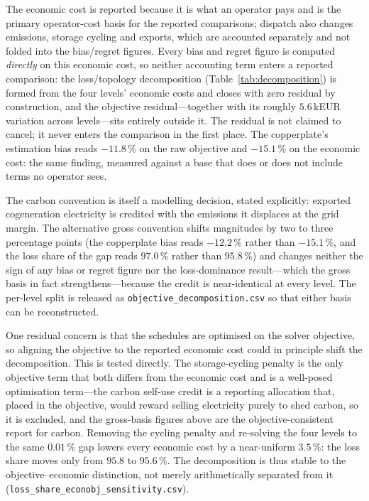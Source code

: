 The economic cost is reported because it is what an operator pays and is the primary
operator-cost basis for the reported comparisons; dispatch also changes emissions, storage
cycling and exports, which are accounted separately and not folded into the bias/regret
figures. Every bias and regret figure is computed \emph{directly} on this
economic cost, so neither accounting term enters a reported comparison: the loss/topology
decomposition (Table~\ref{tab:decomposition}) is formed from the four levels' economic costs and
closes with zero residual by construction, and the objective residual---together with its
roughly $5.6$\,kEUR variation across levels---sits entirely outside it. The residual is not
claimed to cancel; it never enters the comparison in the first place. The copperplate's
estimation bias reads $-11.8$\,\% on the raw objective and $\mathbf{-15.1}$\,\% on the
economic cost: the same finding, measured against a base that does or does not include
terms no operator sees.

The carbon convention is itself a modelling decision, stated explicitly: exported
cogeneration electricity is credited with the emissions it displaces at the grid margin.
The alternative gross convention shifts magnitudes by two to three percentage points
(the copperplate bias reads $-12.2$\,\% rather than $-15.1$\,\%, and the loss share of the gap
reads $97.0$\,\% rather than $95.8$\,\%) and changes
neither the sign of any bias or regret figure nor the loss-dominance result---which the gross
basis in fact strengthens---because the credit is near-identical at every level. The per-level split is released as
\texttt{objective\_decomposition.csv} so that either basis can be reconstructed.

One residual concern is that the schedules are optimised on the solver objective, so
aligning the objective to the reported economic cost could in principle shift the
decomposition. This is tested directly. The storage-cycling penalty is the only objective
term that both differs from the economic cost and is a well-posed optimisation term---the
carbon self-use credit is a reporting allocation that, placed in the objective, would reward
selling electricity purely to shed carbon, so it is excluded, and the gross-basis figures
above are the objective-consistent report for carbon. Removing the cycling penalty and
re-solving the four levels to the same $0.01$\,\% gap lowers every economic cost by a
near-uniform $3.5$\,\%: the loss share moves only from $95.8$ to $95.6$\,\%. The decomposition is thus stable to the objective--economic
distinction, not merely arithmetically separated from it
(\texttt{loss\_share\_econobj\_sensitivity.csv}).
